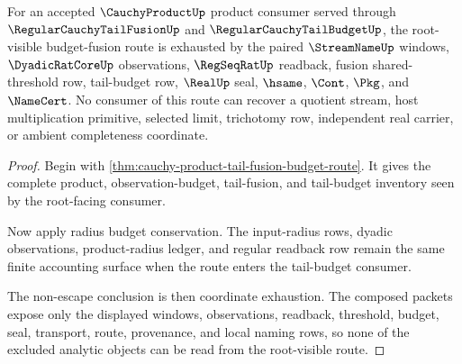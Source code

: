 \begin{theorem}
\label{thm:cauchy-product-root-budget-fusion-nonescape}
For an accepted $\CauchyProductUp$ product consumer served through $\RegularCauchyTailFusionUp$ and $\RegularCauchyTailBudgetUp$, the root-visible budget-fusion route is exhausted by the paired $\StreamNameUp$ windows, $\DyadicRatCoreUp$ observations, $\RegSeqRatUp$ readback, fusion shared-threshold row, tail-budget row, $\RealUp$ seal, $\hsame$, $\Cont$, $\Pkg$, and $\NameCert$. No consumer of this route can recover a quotient stream, host multiplication primitive, selected limit, trichotomy row, independent real carrier, or ambient completeness coordinate.
\end{theorem}
\begin{proof}
Begin with \autoref{thm:cauchy-product-tail-fusion-budget-route}. It gives the complete product, observation-budget, tail-fusion, and tail-budget inventory seen by the root-facing consumer.

Now apply radius budget conservation. The input-radius rows, dyadic observations, product-radius ledger, and regular readback row remain the same finite accounting surface when the route enters the tail-budget consumer.

The non-escape conclusion is then coordinate exhaustion. The composed packets expose only the displayed windows, observations, readback, threshold, budget, seal, transport, route, provenance, and local naming rows, so none of the excluded analytic objects can be read from the root-visible route.
\end{proof}

